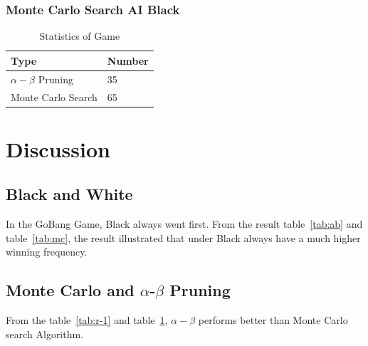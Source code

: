 \documentclass[11pt, a4paper]{article}
\begin{document}
\subsubsection{Monte Carlo Search AI Black}

\begin{table}[htbp] 
	\begin{center}
		\caption{Statistics of Game}
		\begin{tabular}{|l|l|} \hline
			Type & Number  \\ \hline
			$\alpha-\beta$ Pruning  & 35   \\ \hline
			Monte Carlo Search &   65 \\ \hline
			
		\end{tabular}
		
		\label{tab:r-2}
	\end{center}
\end{table}


\section{Discussion}

\subsection{Black and White}

In the GoBang Game, Black always went first. From the result table~\ref{tab:ab} and table~\ref{tab:mc}, the result illustrated that under Black always have a much higher winning frequency.

\subsection{Monte Carlo and $\alpha$-$\beta$ Pruning}

From the table~\ref{tab:r-1} and table~\ref{tab:r-2}, $\alpha-\beta$ performs better than Monte Carlo search Algorithm. 










  
% 





\end{document}
